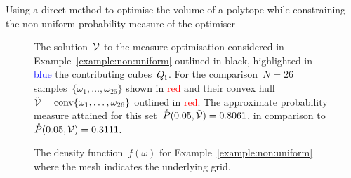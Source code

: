\begin{example}{Using a direct method to optimise the volume of a polytope while constraining the non-uniform probability measure of the optimiser}
\begin{figure}
\caption[Comparison between measure optimised set with fixed combinatorial structure and scenario-based set]{The solution~$\mathcal V$ to the measure optimisation considered in Example~\ref{example:non:uniform} outlined in black, highlighted in \textcolor{blue}{blue} the contributing cubes~$Q_{\mathbf{i}}$.
%
For the comparison~$N=26$ samples~$\{\omega_1,\dots,\omega_{26}\}$ shown in \textcolor{red}{red} and their convex hull~$\tilde{\mathcal V}=\text{conv}\{\omega_1,\dots,\omega_{26}\}$ outlined in \textcolor{red}{red}.
%
The approximate probability measure attained for this set~$\mathring{P}(0.05,\tilde{\mathcal V})=0.8061$, in comparison to~$\mathring{P}(0.05,\mathcal V)=0.3111$.}
\label{fig:example:non:uniform:result}
\end{figure}
%
\begin{figure}\centering
{}
\caption[Non-uniform probability density function]{The density function~$f(\omega)$ for Example~\ref{example:non:uniform} where the mesh indicates the underlying grid.}
\label{fig:example:non:uniform:distribution}
\end{figure}
\end{example}
%
%
%
%